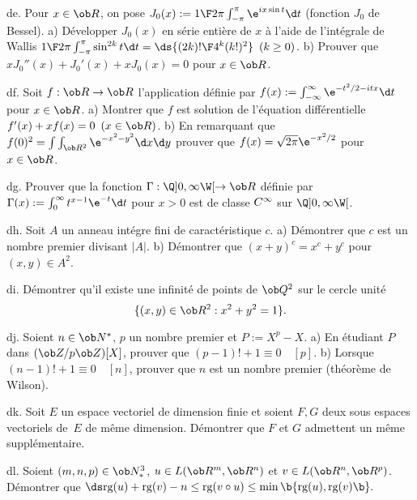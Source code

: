 \exo [Level=2,Fight=2,Learn=2,Type=\Exercices,Field=\SériesEntières, Origin=] de. 
Pour $x\in\ob R$, on pose $J_0(x):={1\F2\pi}\int_{-\pi}^\pi\e^{ix\sin t}\d t$ (fonction $J_0$ de Bessel). \pn
a) Développer $J_0(x)$ en série entière de $x$ à l'aide 
de l'intégrale de Wallis ${1\F2\pi}\int_{-\pi}^\pi\sin^{2k}t\d t=\ds{(2k)!\F4^k(k!)^2}\ \,(k\ge0)$. \pn
b) Prouver que $xJ_0''(x)+J_0'(x)+xJ_0(x)=0$ pour $x\in\ob R$. 


\exo [Level=2,Fight=2,Learn=2,Field=\FonctionsDéfiniesParUneIntégrale,Type=\Exercices,Origin=] df. 
Soit $f:\ob R\to\ob R$ 
l'application définie par $f(x):=\int_{-\infty}^\infty\e^{-t^2/2-itx}\d t$ pour $x\in\ob R$. \pn
a) Montrer que $f$ est solution de l'équation différentielle $f'(x)+xf(x)=0\ \,(x\in\ob R)$. \pn
b) En remarquant que $f(0)^2=\int\int_{\ob R^2}\e^{-x^2-y^2}\d x\d y$ 
prouver que $f(x)=\sqrt{2\pi}\e^{-x^2/2}$ pour $x\in\ob R$. 


\exo [Level=2,Fight=1,Learn=1,Type=\Exercices,Field=\FonctionsDéfiniesParUneIntégrale, Origin=] dg. 
Prouver que la fonction $\Gamma:\Q]0,\infty\W[\to\ob R$ 
définie par $\Gamma(x):=\int_0^\infty t^{x-1}\e^{-t}\d t$ pour $x>0$ 
est de classe $\sc C^\infty$ sur $\Q]0,\infty\W[$. 

\exo [Level=1,Fight=3,Learn=2,Type=\Others,Field=\Anneaux,Origin=\MP] dh. 
Soit $A$ un anneau intégre fini de caractéristique $c$. \pn
a) Démontrer que $c$ est un nombre premier divisant $|A|$. \pn
b) Démontrer que $(x+y)^c=x^c+y^c$ pour $(x,y)\in A^2$.  

\exo [Level=1,Fight=3,Learn=1,Type=\Others,Field=\Trigonométrie,Origin=\Capaces] di. 
Démontrer qu'il existe une infinité de points de $\ob Q^2$ 
sur le cercle unité 
$$
\{(x,y)\in\ob R^2: x^2+y^2=1\}.
$$ 

\exo [Level=1,Fight=3,Learn=2,Type=\Others,Field=\Anneaux,Origin=\MP] dj. 
Soient $n\in\ob N^*$, $p$ un nombre premier et $P:=X^p-X$. \pn
a) En étudiant $P$ dans $(\ob Z/p\ob Z)[X]$, prouver que $(p-1)!+1\equiv0\quad[p]$. \pn
b) Lorsque $(n-1)!+1\equiv0\quad[n]$, prouver que $n$ est un nombre premier (théorème de Wilson). 

\exo [Level=1,Fight=2,Learn=1,Type=\Colles,Field=\EspacesVectoriels,Origin=] dk. 
Soit $E$ un espace vectoriel de dimension finie et soient $F,G$ 
deux sous espaces vectoriels de~$E$ de même dimension. Démontrer que $F$ et $G$ 
admettent un même supplémentaire. 

\exo [Level=1,Fight=2,Learn=2,Type=\Colles,Field=\EspacesVectoriels,Origin=] dl. 
Soient $(m,n,p)\in\ob N_*^3$, $u\in\sc L(\ob R^m,\ob R^n)$ et $v\in\sc L(\ob R^n,\ob R^p)$. 
Démontrer que 
\smallskip
\hfill
$\ds
\hbox{\rm rg}(u)+\hbox{\rm rg}(v)-n\le\hbox{\rm rg}(v\circ u)\le\min\b\{\hbox{\rm rg}(u),\hbox{\rm rg}(v)\b\}.
$\hfill\null
\PAR

